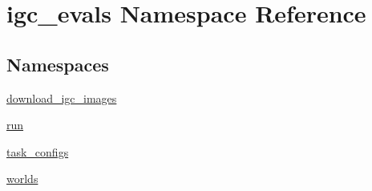 \hypertarget{namespaceigc__evals}{}\section{igc\+\_\+evals Namespace Reference}
\label{namespaceigc__evals}
\subsection*{Namespaces}
\begin{DoxyCompactItemize}
\item 
 \hyperlink{namespaceigc__evals_1_1download__igc__images}{download\+\_\+igc\+\_\+images}
\item 
 \hyperlink{namespaceigc__evals_1_1run}{run}
\item 
 \hyperlink{namespaceigc__evals_1_1task__configs}{task\+\_\+configs}
\item 
 \hyperlink{namespaceigc__evals_1_1worlds}{worlds}
\end{DoxyCompactItemize}
